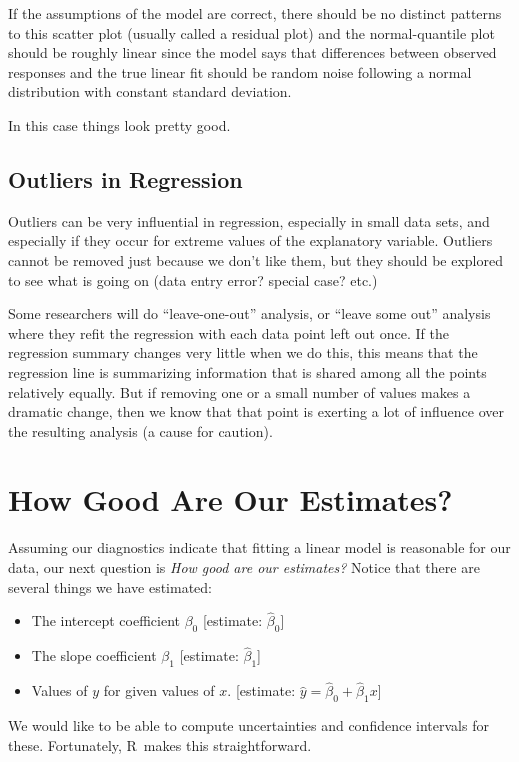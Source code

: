 \documentclass[twoside]{book}
\def\R{{\sf R}}
\begin{document}
If the assumptions of the model are correct, there should be no distinct patterns to this scatter
plot (usually called a residual plot) and the normal-quantile plot should be roughly linear
since the model says that differences between observed responses and the true linear fit
should be random noise following a normal distribution with constant standard deviation.

In this case things look pretty good. 

\subsection{Outliers in Regression}

Outliers can be very influential in regression, especially in small data sets,
and especially if they occur for extreme values of the explanatory variable.
Outliers cannot be removed just because we don't like them, but they should be
explored to see what is going on (data entry error? special case? etc.)

Some researchers will do ``leave-one-out'' analysis, or ``leave some out'' analysis
where they refit the regression with each data point left out once.  If the regression
summary changes very little when we do this, this means that the regression line
is summarizing information that is shared among all the points relatively equally.
But if removing one or a small number of values makes a dramatic change, then
we know that that point is exerting a lot of influence over the resulting
analysis (a cause for caution).   

\section{How Good Are Our Estimates?}
Assuming our diagnostics indicate that fitting a linear model is reasonable for our data,
our next question is \emph{How good are our estimates?}
Notice that there are several things we have estimated:
\begin{itemize}
	\item The intercept coefficient $\beta_0$ 
		[estimate: $\hat \beta_0$]
	\item The slope coefficient $\beta_1$ 
		[estimate: $\hat \beta_1$]
	\item Values of $y$ for given values of $x$. 
		[estimate: $\hat y = \hat \beta_0 + \hat \beta_1 x$]
\end{itemize}

We would like to be able to compute uncertainties and confidence intervals for these.
Fortunately, \R\ makes this straightforward.
\end{document}
